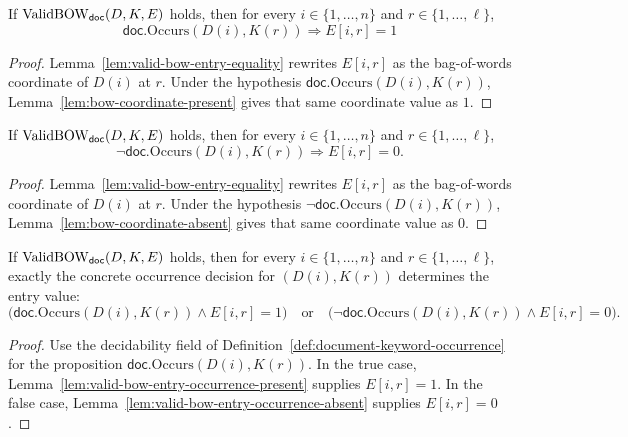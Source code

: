 \begin{lemma}
  \label{lem:valid-bow-entry-occurrence-present}
  If $\operatorname{ValidBOW}_{\mathsf{doc}}(D,K,E)$ holds, then for every
  $i\in\{1,\ldots,n\}$ and $r\in\{1,\ldots,\ell\}$,
  \[
    \mathsf{doc}.\mathrm{Occurs}(D(i),K(r))\Rightarrow E[i,r]=1
  \]
\end{lemma}
\begin{proof}
  Lemma~\ref{lem:valid-bow-entry-equality} rewrites $E[i,r]$ as the
  bag-of-words coordinate of $D(i)$ at $r$.  Under the hypothesis
  $\mathsf{doc}.\mathrm{Occurs}(D(i),K(r))$,
  Lemma~\ref{lem:bow-coordinate-present} gives that same coordinate value as
  $1$.
\end{proof}

\begin{lemma}
  \label{lem:valid-bow-entry-occurrence-absent}
  If $\operatorname{ValidBOW}_{\mathsf{doc}}(D,K,E)$ holds, then for every
  $i\in\{1,\ldots,n\}$ and $r\in\{1,\ldots,\ell\}$,
  \[
    \neg\mathsf{doc}.\mathrm{Occurs}(D(i),K(r))\Rightarrow E[i,r]=0.
  \]
\end{lemma}
\begin{proof}
  Lemma~\ref{lem:valid-bow-entry-equality} rewrites $E[i,r]$ as the
  bag-of-words coordinate of $D(i)$ at $r$.  Under the hypothesis
  $\neg\mathsf{doc}.\mathrm{Occurs}(D(i),K(r))$,
  Lemma~\ref{lem:bow-coordinate-absent} gives that same coordinate value as
  $0$.
\end{proof}

\begin{lemma}
  \label{lem:valid-bow-entry-occurrence-cases}
  If $\operatorname{ValidBOW}_{\mathsf{doc}}(D,K,E)$ holds, then for every
  $i\in\{1,\ldots,n\}$ and $r\in\{1,\ldots,\ell\}$, exactly the concrete
  occurrence decision for $(D(i),K(r))$ determines the entry value:
  \[
    \bigl(\mathsf{doc}.\mathrm{Occurs}(D(i),K(r))\wedge E[i,r]=1\bigr)
    \quad\text{or}\quad
    \bigl(\neg\mathsf{doc}.\mathrm{Occurs}(D(i),K(r))\wedge E[i,r]=0\bigr).
  \]
\end{lemma}
\begin{proof}
  Use the decidability field of
  Definition~\ref{def:document-keyword-occurrence} for the proposition
  $\mathsf{doc}.\mathrm{Occurs}(D(i),K(r))$.  In the true case,
  Lemma~\ref{lem:valid-bow-entry-occurrence-present} supplies $E[i,r]=1$.
  In the false case, Lemma~\ref{lem:valid-bow-entry-occurrence-absent}
  supplies $E[i,r]=0$.
\end{proof}

